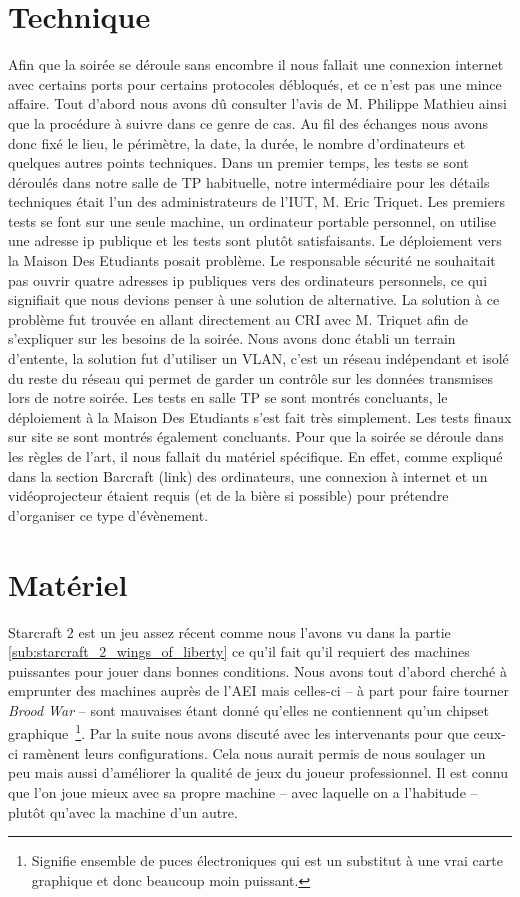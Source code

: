 \section{Technique}%
\label{sec:technique}

Afin que la soirée se déroule sans encombre il nous fallait une connexion
internet avec certains ports pour certains protocoles débloqués, et ce
n'est pas une mince affaire. Tout d'abord nous avons dû consulter l'avis de
M. Philippe Mathieu ainsi que la procédure à suivre dans ce genre de cas. Au fil
des échanges nous avons donc fixé le lieu, le périmètre, la date, la
durée, le nombre d'ordinateurs et quelques autres points techniques.
Dans un premier temps, les tests se sont déroulés dans notre salle de TP
habituelle, notre intermédiaire pour les détails techniques était l'un des 
administrateurs de l'IUT, M. Eric Triquet. 
Les premiers tests se font sur une seule machine, un ordinateur portable personnel, 
on utilise une adresse ip publique et les tests sont plutôt satisfaisants. 
Le déploiement vers la Maison Des Etudiants posait problème. Le responsable sécurité ne souhaitait pas ouvrir
quatre adresses ip publiques vers des ordinateurs personnels, ce qui signifiait 
que nous devions penser à une solution de alternative. La solution à ce problème fut
trouvée en allant directement au CRI avec M. Triquet afin de
s'expliquer sur les besoins de la soirée. Nous avons donc établi un
terrain d'entente, la solution fut d'utiliser un VLAN, c'est un réseau
indépendant et isolé du reste du réseau qui permet de garder un contrôle
sur les données transmises lors de notre soirée. Les tests en salle TP
se sont montrés concluants, le déploiement à la Maison Des
Etudiants s'est fait très simplement. Les tests finaux sur site se sont montrés
également concluants.
Pour que la soirée se déroule dans les règles de l'art, il nous fallait
du matériel spécifique. En effet, comme expliqué dans la section
Barcraft (link) des ordinateurs, une connexion à internet et un
vidéoprojecteur étaient requis (et de la bière si possible) pour prétendre d'organiser ce type d'évènement.

\section{Matériel}%
\label{sec:materiel}

Starcraft 2 est un jeu assez récent comme nous l'avons vu dans la
partie \ref{sub:starcraft_2_wings_of_liberty} ce qu'il fait qu'il requiert des machines puissantes pour jouer
dans bonnes conditions. Nous avons tout d'abord cherché à emprunter des
machines auprès de l'AEI mais celles-ci -- à part pour faire tourner
\emph{Brood
War} -- sont mauvaises étant donné qu'elles ne contiennent qu'un chipset
graphique\, \footnote{Signifie \og ensemble de puces électroniques \fg{}
qui est un substitut à une vrai carte graphique et donc beaucoup moin
puissant.}. Par la suite nous avons discuté avec les
intervenants pour que ceux-ci ramènent leurs configurations. Cela nous
aurait permis de nous soulager un peu mais aussi d'améliorer la qualité
de jeux du joueur professionnel. Il est connu que l'on joue mieux avec sa
propre machine -- avec laquelle on a l'habitude -- plutôt qu'avec la machine d'un
autre.

